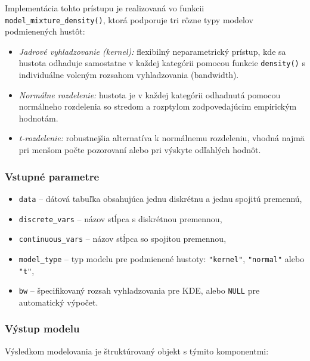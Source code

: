 Implementácia tohto prístupu je realizovaná vo funkcii \texttt{model\_mixture\_density()}, ktorá podporuje tri rôzne typy modelov podmienených hustôt:

\begin{itemize}
\setlength{\itemsep}{0pt}
  \setlength{\parskip}{0pt}
  \item \textit{Jadrové vyhladzovanie (kernel):} flexibilný neparametrický prístup, kde sa hustota odhaduje samostatne v každej kategórii pomocou funkcie \texttt{density()} s individuálne voleným rozsahom vyhladzovania (bandwidth).
  \item \textit{Normálne rozdelenie:} hustota je v každej kategórii odhadnutá pomocou normálneho rozdelenia so stredom a rozptylom zodpovedajúcim empirickým hodnotám.
  \item \textit{t-rozdelenie:} robustnejšia alternatíva k normálnemu rozdeleniu, vhodná najmä pri menšom počte pozorovaní alebo pri výskyte odľahlých hodnôt.
\end{itemize}

\subsubsection{Vstupné parametre}

\begin{itemize}
\setlength{\itemsep}{0pt}
  \setlength{\parskip}{0pt}
  \item \texttt{data} – dátová tabuľka obsahujúca jednu diskrétnu a jednu spojitú premennú,
  \item \texttt{discrete\_vars} – názov stĺpca s diskrétnou premennou,
  \item \texttt{continuous\_vars} – názov stĺpca so spojitou premennou,
  \item \texttt{model\_type} – typ modelu pre podmienené hustoty: \texttt{"kernel"}, \texttt{"normal"} alebo \texttt{"t"},
  \item \texttt{bw} – špecifikovaný rozsah vyhladzovania pre KDE, alebo \texttt{NULL} pre automatický výpočet.
\end{itemize}

\subsubsection{Výstup modelu}

Výsledkom modelovania je štruktúrovaný objekt s týmito komponentmi:

